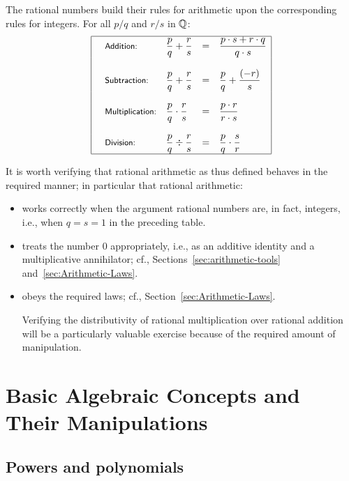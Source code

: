 \medskip

The rational numbers build their rules for arithmetic upon the
corresponding rules for integers.  For all $p/q$ and $r/s$ in $\mathbb{Q}$:
\[
\begin{array}{|llcl|}
\hline
\mbox{\small\sf Addition:} & 
{\displaystyle
{p \over q} + {r \over s} }
  & = &
{\displaystyle
 \frac{p \cdot s + r \cdot q}{q \cdot s} }  \\
 & & & \\
\mbox{\small\sf Subtraction:} &
{\displaystyle
{p \over q} + {r \over s} }
  & = & 
{\displaystyle
{p \over q} + {(-r) \over s} } \\
 & & & \\
\mbox{\small\sf Multiplication:} &
{\displaystyle
{p \over q} \cdot {r \over s} }
  & = & 
{\displaystyle
\frac{p \cdot r}{r \cdot s} } \\
  & & & \\
\mbox{\small\sf Division:} &
{\displaystyle
{p \over q} \div {r \over s} }
  & = &
{\displaystyle
{p \over q} \cdot {s \over r} } \\
\hline
\end{array}
\]

It is worth verifying that rational arithmetic as thus defined behaves
in the required manner; in particular that rational arithmetic:
\begin{itemize}
\item
works correctly when the argument rational numbers are, in fact,
integers, i.e., when $q = s = 1$ in the preceding table.
\item
treats the number $0$ appropriately, i.e., as an additive identity and
a multiplicative annihilator; cf., Sections~\ref{sec:arithmetic-tools}
and~\ref{sec:Arithmetic-Laws}.
\item
obeys the required laws; cf., Section~\ref{sec:Arithmetic-Laws}.

Verifying the distributivity of rational multiplication over rational
addition will be a particularly valuable exercise because of the
required amount of manipulation.
\end{itemize}

\section{Basic Algebraic Concepts and Their Manipulations}

\subsection{Powers and polynomials}
\label{sec:powers+polynolmials}

